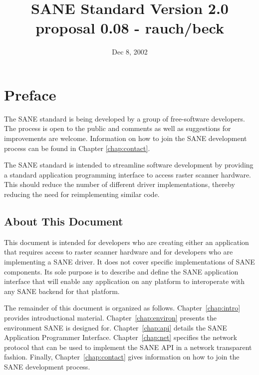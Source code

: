 \documentclass[11pt,DVIps]{report}
\title{\huge SANE Standard Version 2.0 proposal 0.08 - rauch/beck}
\author{}
\date{Dec 8, 2002}
\begin{document}
\newcommand{\filename}[1]{{\tt #1}}
\newcommand{\code}[1]{{\tt #1}}
\newcommand{\var}[1]{{\it #1}}
\newcommand{\defn}[1]{#1\index{#1}}

\begin{latexonly}
  \setcounter{changebargrey}{0}   %
\end{latexonly}

\maketitle
\tableofcontents
\listoffigures
\listoftables


\chapter{Preface}

The SANE standard is being developed by a group of free-software
developers.  The process is open to the public and comments as well as
suggestions for improvements are welcome.  Information on how to join
the SANE development process can be found in Chapter
\ref{chap:contact}.

The SANE standard is intended to streamline software development by
providing a standard application programming interface to access
raster scanner hardware.  This should reduce the number of different
driver implementations, thereby reducing the need for reimplementing
similar code.


\section{About This Document}

This document is intended for developers who are creating either an
application that requires access to raster scanner hardware and for
developers who are implementing a SANE driver.  It does not cover
specific implementations of SANE components.  Its sole purpose is to
describe and define the SANE application interface that will enable
any application on any platform to interoperate with any SANE backend
for that platform.

The remainder of this document is organized as follows.
Chapter~\ref{chap:intro} provides introductional material.
Chapter~\ref{chap:environ} presents the environment SANE is designed
for.  Chapter~\ref{chap:api} details the SANE Application Programmer
Interface.  Chapter~\ref{chap:net} specifies the network protocol that
can be used to implement the SANE API in a network transparent
fashion.  Finally, Chapter~\ref{chap:contact} gives information on how
to join the SANE development process.
\end{document}
